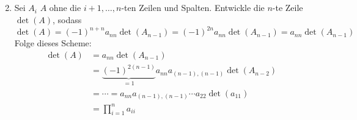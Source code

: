 \documentclass[sectionformat = aufgabe]{gadsescript}
\begin{document}
\maketitle
\setcounter{section}{11}
\subsection{}
\begin{enumerate}[label=(\alph*)]
	\setcounter{enumi}{1}
	\item Sei $ A_i $ $ A $ ohne die $ i+1, \dotsc, n $-ten Zeilen und Spalten.
		Entwickle die $ n $-te Zeile $ \det(A) $, sodass
		\[
			\det(A) = (-1)^{n + n} a_{nn}  \det(A_{n - 1} ) = (-1)^{2n} a_{nn} \det(A_{n - 1} ) = a_{nn} \det(A_{n - 1} )
		\]
		Folge dieses Scheme:
		\begin{align*}
			\det(A) &= a_{nn}  \det(A_{n - 1} ) \\
			~ &= \underbrace{(-1)^{2(n - 1)}}_{= 1} a_{nn} a_{(n-1),(n-1)}   \det(A_{n - 2} ) \\
			~ &= \dotsb = a_{nn} a_{(n-1),(n-1)} \dotsb a_{22} \det(a_{11}) \\
			~ &= \prod_{i=1}^{n} a_{ii}  
		\end{align*}
\end{enumerate}
\end{document}
